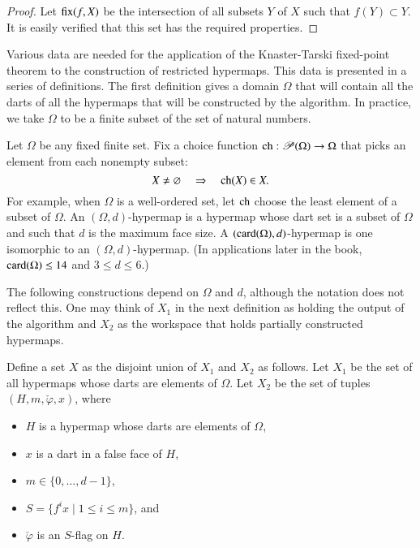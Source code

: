 \begin{proof} Let ${\operatorname{fix}}(f,X)$ be the intersection of all subsets
$Y$ of $X$ such that $f(Y)\subset Y$.  It is easily verified that
this set has the required properties.
\end{proof}

Various data are needed for the application of the Knaster-Tarski
fixed-point theorem to the construction of restricted hypermaps.  This
data is presented in a series of definitions.  The first definition
gives a domain $\Omega$ that will contain all the darts of all the
hypermaps that will be constructed by the algorithm.  In practice, we
take $\Omega$ to be a finite subset of the set of natural numbers.

\begin{definition}[$\Omega$,~$\op{ch}$,~$d$]
  Let $\Omega$ be any fixed finite set.  Fix a choice function
  ${\operatorname{ch}}:{\mathscr P}(\Omega)\to \Omega$ that picks an element from
  each nonempty subset:
\begin{displaymath}
X\ne\varnothing\quad  \Rightarrow \quad  {\operatorname{ch}}(X)\in X.
\end{displaymath}
For example, when
$\Omega$ is a well-ordered set, let $\op{ch}$ choose the least element of a subset
of $\Omega$.  An $(\Omega,d)$-hypermap is a hypermap whose dart set is a
subset of $\Omega$ and such that $d$ is the maximum face size.  A
$({\operatorname{card}}(\Omega),d)$-hypermap is one isomorphic to an $(\Omega,d)$-hypermap.
(In applications later in the book, ${\operatorname{card}}(\Omega)\le14$ and $3\le d\le 6$.) 
\end{definition}
%
%
%


The following constructions depend on $\Omega$ and $d$, although the
notation does not reflect this.  One may think of $X_1$ in the next
definition as holding the output of the algorithm and $X_2$ as the
workspace that holds partially constructed hypermaps.

\begin{definition}[$X$,~$X_1$,~$X_2$]
Define a set $X$ as the disjoint union of $X_1$ and $X_2$ as follows.
Let $X_1$ be the set of all hypermaps whose darts are elements of $\Omega$.
Let $X_2$ be the set of tuples $(H,m,\check\varphi,x)$, where 
\begin{itemize}
\item $H$ is a
hypermap whose darts are elements of $\Omega$, 
\item  $x$ is a dart in a false face of $H$,
\item $m\in\{0,\ldots,d-1\}$,
\item $S = \{f^i x\mid 1 \le i \le m\}$,
and
\item $\check\varphi$ is an $S$-flag on $H$.
\end{itemize}
\end{definition}


